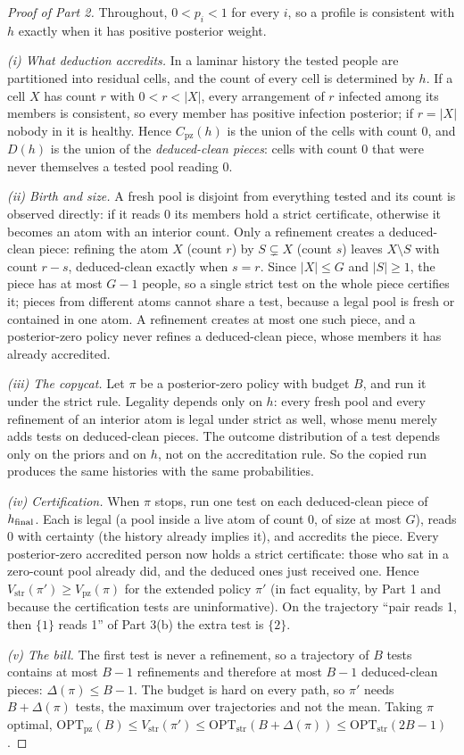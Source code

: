\documentclass[11pt]{article}
\theoremstyle{remark}
\newcommand{\pz}{\mathrm{pz}}
\newcommand{\str}{\mathrm{str}}
\newcommand{\OPT}{\mathrm{OPT}}
\newcommand{\Cpz}{C_{\pz}}
\begin{document}
\begin{proof}[Proof of Part 2]
Throughout, $0<p_i<1$ for every $i$, so a profile is consistent with $h$ exactly when it has positive posterior weight.

\emph{(i) What deduction accredits.} In a laminar history the tested people are partitioned into residual cells, and the count of every cell is determined by $h$. If a cell $X$ has count $r$ with $0<r<|X|$, every arrangement of $r$ infected among its members is consistent, so every member has positive infection posterior; if $r=|X|$ nobody in it is healthy. Hence $\Cpz(h)$ is the union of the cells with count $0$, and $D(h)$ is the union of the \emph{deduced-clean pieces}: cells with count $0$ that were never themselves a tested pool reading $0$.

\emph{(ii) Birth and size.} A fresh pool is disjoint from everything tested and its count is observed directly: if it reads $0$ its members hold a strict certificate, otherwise it becomes an atom with an interior count. Only a refinement creates a deduced-clean piece: refining the atom $X$ (count $r$) by $S\subsetneq X$ (count $s$) leaves $X\setminus S$ with count $r-s$, deduced-clean exactly when $s=r$. Since $|X|\le G$ and $|S|\ge1$, the piece has at most $G-1$ people, so a single strict test on the whole piece certifies it; pieces from different atoms cannot share a test, because a legal pool is fresh or contained in one atom. A refinement creates at most one such piece, and a posterior-zero policy never refines a deduced-clean piece, whose members it has already accredited.

\emph{(iii) The copycat.} Let $\pi$ be a posterior-zero policy with budget $B$, and run it under the strict rule. Legality depends only on $h$: every fresh pool and every refinement of an interior atom is legal under strict as well, whose menu merely adds tests on deduced-clean pieces. The outcome distribution of a test depends only on the priors and on $h$, not on the accreditation rule. So the copied run produces the same histories with the same probabilities.

\emph{(iv) Certification.} When $\pi$ stops, run one test on each deduced-clean piece of $h_{\rm final}$. Each is legal (a pool inside a live atom of count $0$, of size at most $G$), reads $0$ with certainty (the history already implies it), and accredits the piece. Every posterior-zero accredited person now holds a strict certificate: those who sat in a zero-count pool already did, and the deduced ones just received one. Hence $V_\str(\pi')\ge V_\pz(\pi)$ for the extended policy $\pi'$ (in fact equality, by Part 1 and because the certification tests are uninformative). On the trajectory ``pair reads 1, then $\{1\}$ reads 1'' of Part 3(b) the extra test is $\{2\}$.

\emph{(v) The bill.} The first test is never a refinement, so a trajectory of $B$ tests contains at most $B-1$ refinements and therefore at most $B-1$ deduced-clean pieces: $\Delta(\pi)\le B-1$. The budget is hard on every path, so $\pi'$ needs $B+\Delta(\pi)$ tests, the maximum over trajectories and not the mean. Taking $\pi$ optimal, $\OPT_\pz(B)\le V_\str(\pi')\le\OPT_\str(B+\Delta(\pi))\le\OPT_\str(2B-1)$.
\end{proof}
\end{document}
